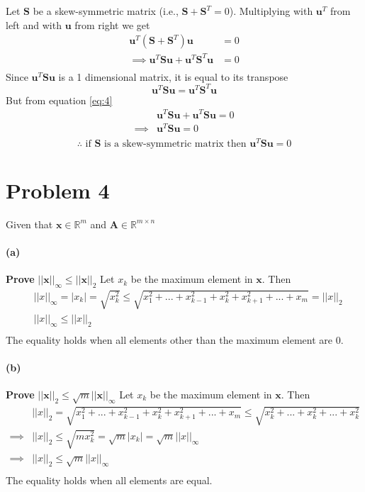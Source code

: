 \documentclass[12pt, letterpaper]{article}
\begin{document}
Let $\mathbf{S}$ be a skew-symmetric matrix (i.e., $\mathbf{S} + \mathbf{S}^T = 0$). Multiplying with $\mathbf{u}^T$ from left and with $\mathbf{u}$ from right we get
\begin{equation}
  \label{eq:4}
  \begin{split}
  \mathbf{u}^T\left(\mathbf{S} + \mathbf{S}^T \right)\mathbf{u} &= 0\\
  \implies \mathbf{u}^T\mathbf{Su} + \mathbf{u}^T\mathbf{S}^T\mathbf{u} &= 0\\
  \end{split}
\end{equation}
Since $\mathbf{u}^T\mathbf{Su}$ is a 1 dimensional matrix, it is equal to its transpose
\[\mathbf{u}^T\mathbf{Su} = \mathbf{u}^T\mathbf{S}^T\mathbf{u}\]
But from equation \eqref{eq:4}
\begin{align*}
  &\mathbf{u}^T\mathbf{Su} + \mathbf{u}^T\mathbf{Su} = 0\\
  \implies &\mathbf{u}^T\mathbf{Su} = 0\\
\end{align*}
\[\boxed{\therefore \text{ if }\mathbf{S}\text{ is a skew-symmetric matrix}\text{ then }\mathbf{u}^T\mathbf{Su} = 0}\]

\pagebreak
\section*{Problem 4}
\label{sec:problem-4}

Given that $\mathbf{x} \in \mathbb{R}^m$ and $\mathbf{A} \in \mathbb{R}^{m \times n}$

\paragraph{(a)} \textbf{Prove} $||\mathbf{x}||_\infty \leq ||\mathbf{x}||_2$
Let $x_k$ be the maximum element in $\mathbf{x}$. Then
\begin{align*}
  &||x||_\infty = |x_k| = \sqrt{x_k^2} \leq \sqrt{x_1^2 + ... + x_{k-1}^2 + x_k^2 + x_{k+1}^2 + ... + x_m} = ||x||_2\\
  &\boxed{||x||_\infty \leq ||x||_2}\\
\end{align*}
The equality holds when all elements other than the maximum element are 0.

\paragraph{(b)} \textbf{Prove} $||\mathbf{x}||_2 \leq \sqrt{m}||\mathbf{x}||_\infty$
Let $x_k$ be the maximum element in $\mathbf{x}$. Then
\begin{align*}
  &||x||_2 = \sqrt{x_1^2 + ... + x_{k-1}^2 + x_k^2 + x_{k+1}^2 + ... + x_m} \leq \sqrt{x_k^2 + ... + x_k^2 + ... + x_k^2}\\
  \implies &||x||_2 \leq \sqrt{mx_k^2} = \sqrt{m}|x_k| = \sqrt{m}||x||_\infty\\
  \implies &\boxed{||x||_2 \leq \sqrt{m}||x||_\infty}\\
\end{align*}
The equality holds when all elements are equal.
\end{document}
